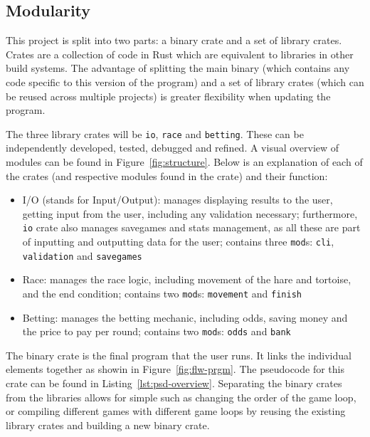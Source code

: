 \documentclass[11pt]{article}
\begin{document}
\subsection{Modularity}
\label{sec:modules}

This project is split into two parts: a binary crate and a set of library crates. Crates are a collection of code
in Rust which are equivalent to libraries in other build systems. The advantage of splitting the main binary
(which contains any code specific to this version of the program) and a set of library crates (which can be reused
across multiple projects) is greater flexibility when updating the program.

The three library crates will be \texttt{io}, \texttt{race} and \texttt{betting}. These can be independently
developed, tested, debugged and refined. A visual overview of modules can be found in Figure~\ref{fig:structure}.
Below is an explanation of each of the crates (and respective modules found in the crate) and their function:
\begin{itemize}
	\item I/O (stands for Input/Output): manages displaying results to the user, getting input
	      from the user, including any validation necessary; furthermore, \texttt{io} crate also manages
	      savegames and stats management, as all these are part of inputting and outputting data for the user;
	      contains three \texttt{mod}s: \texttt{cli}, \texttt{validation} and \texttt{savegames}
	\item Race: manages the race logic, including movement of the hare and tortoise, and the end
	      condition; contains two \texttt{mod}s: \texttt{movement} and \texttt{finish}
	\item Betting: manages the betting mechanic, including odds, saving money and the price to pay per round;
	      contains two \texttt{mod}s: \texttt{odds} and \texttt{bank}
\end{itemize}

The binary crate is the final program that the user runs. It links the individual elements together as
showin in Figure~\ref{fig:flw-prgm}. The pseudocode for this crate can be found in
Listing~\ref{lst:psd-overview}. Separating the binary crates from the libraries allows for simple
such as changing the order of the game loop, or compiling different games with different game loops by
reusing the existing library crates and building a new binary crate.
\end{document}

